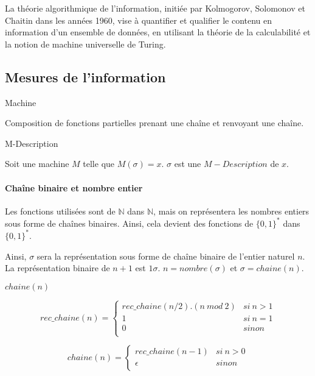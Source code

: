 La théorie algorithmique de l'information, initiée par Kolmogorov, Solomonov et Chaitin dans les années 1960, vise à quantifier et qualifier le contenu en information d'un ensemble de données, en utilisant la théorie de la calculabilité et la notion de machine universelle de Turing.

	\subsection{Mesures de l'information}

\begin{definition}{Machine}
\par Composition de fonctions partielles prenant une chaîne et renvoyant une chaîne.
\end{definition}

\begin{definition}{M-Description}
\par Soit une machine $M$ telle que $M(\sigma) = x$. $\sigma$ est une $M-Description$ de $x$.
\end{definition}

\paragraph{Chaîne binaire et nombre entier} Les fonctions utilisées sont de $\mathbb{N}$ dans $\mathbb{N}$, mais on représentera les nombres entiers sous forme de chaînes binaires. Ainsi, cela devient des fonctions de $\{0,1\}^*$ dans $\{0,1\}^*$.
\par Ainsi, $\sigma$ sera la représentation sous forme de chaîne binaire de l'entier naturel $n$. La représentation binaire de $n+1$ est $1\sigma$. $n = nombre(\sigma)$ et $\sigma = chaine(n)$.

\begin{definition}{$chaine(n)$}
\par $$ rec\_chaine(n) = 
			\left \{
				\begin{array}{ll}
					rec\_chaine(n/2).(n~mod~2) & si~ n > 1 \\
					1 & si~ n = 1 \\
					0 & sinon \\
				\end{array}
			\right.
	$$
\par $$ chaine(n) = 
			\left \{
				\begin{array}{ll}
					rec\_chaine(n-1) & si~ n > 0 \\
					\epsilon & sinon \\
				\end{array}
			\right.
	$$
\end{definition}

